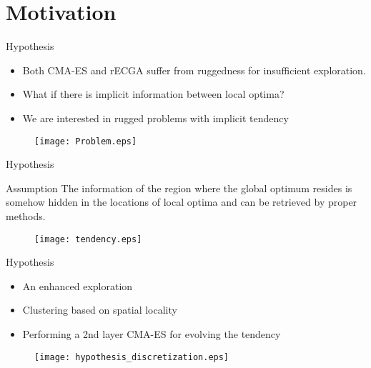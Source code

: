 \section{Motivation}

\begin{frame}{Hypothesis}
  \begin{itemize}
    \item Both CMA-ES and rECGA suffer from \alert{ruggedness} for
      insufficient exploration.
      \vspace*{8pt}
    \item What if there is implicit information between local optima?
    \item We are interested in rugged problems with implicit tendency
  \end{itemize}
  \vspace*{10pt}
  \begin{figure}[hp]
    \centering
    \texttt{[image: Problem.eps]}
  \end{figure}
\end{frame}

\begin{frame}{Hypothesis}
      \vspace*{10pt}

  \begin{block}{Assumption}
   The information of the region where the global optimum resides is
   somehow hidden in the locations of local optima and can be retrieved
   by proper methods.
  \end{block}
  \begin{figure}[hp]
    \centering
    \texttt{[image: tendency.eps]}
  \end{figure}
\end{frame}
\begin{frame}{Hypothesis}
  \begin{itemize}
    \item An enhanced exploration  
      \vspace*{10pt}
    \item Clustering based on spatial locality  
  \vspace*{10pt}
\item Performing a 2nd layer CMA-ES for evolving the tendency
  \end{itemize}
  \vspace*{10pt}
  \begin{figure}[htpb]
    \centering
    \texttt{[image: hypothesis\_discretization.eps]}
  \end{figure}
\end{frame}

